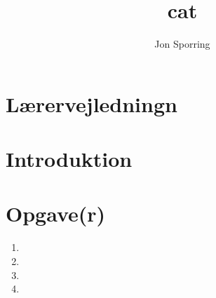 \documentclass[a4paper,12pt]{article}
\title{cat}
\author{Jon Sporring}
\begin{document}
\maketitle

\section{Lærervejledningn}

\section{Introduktion}

\section{Opgave(r)}
\begin{enumerate}
\item 
\item 
\item 
\item 
\end{enumerate}
\end{document}
